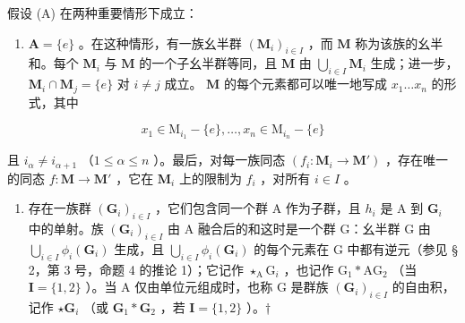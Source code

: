 假设 (A) 在两种重要情形下成立：

\begin{enumerate}
\def\labelenumi{(\alph{enumi})}
\tightlist
\item
  \(\mathbf{A} = \{e\}\) 。在这种情形，有一族幺半群 \((\mathbf{M}_i)_{i\in I}\) ，而 \(\mathbf{M}\) 称为该族的幺半和。每个 \(\mathbf{M}_i\) 与 \(\mathbf{M}\) 的一个子幺半群等同，且 \(\mathbf{M}\) 由 \(\bigcup_{i\in I}\mathbf{M}_i\) 生成；进一步，\(\mathbf{M}_i\cap \mathbf{M}_j = \{e\}\) 对 \(i\neq j\) 成立。 \(\mathbf{M}\) 的每个元素都可以唯一地写成 \(x_{1}\ldots x_{n}\) 的形式，其中
\end{enumerate}

\[
x _ {1} \in \mathrm{M} _ {i _ {1}} - \{e \}, \dots , x _ {n} \in \mathrm{M} _ {i _ {n}} - \{e \}
\]

且 \(i_{\alpha} \neq i_{\alpha + 1}\) （\(1 \leqslant \alpha \leqslant n\) ）。最后，对每一族同态 \((f_i: \mathbf{M}_i \to \mathbf{M}')\) ，存在唯一的同态 \(f: \mathbf{M} \to \mathbf{M}'\) ，它在 \(\mathbf{M}_i\) 上的限制为 \(f_i\) ，对所有 \(i \in I\) 。

\begin{enumerate}
\def\labelenumi{(\alph{enumi})}
\setcounter{enumi}{1}
\tightlist
\item
  存在一族群 \((\mathbf{G}_i)_{i\in I}\) ，它们包含同一个群 A 作为子群，且 \(h_i\) 是 A 到 \(\mathbf{G}_i\) 中的单射。族 \((\mathbf{G}_i)_{i\in I}\) 由 A 融合后的和这时是一个群 G：幺半群 G 由 \(\bigcup_{i\in I}\phi_i(\mathbf{G}_i)\) 生成，且 \(\bigcup_{i\in I}\phi_i(\mathbf{G}_i)\) 的每个元素在 G 中都有逆元（参见 § 2，第 3 号，命题 4 的推论 1）；它记作 \(\star_{\mathrm{A}}\mathrm{G}_{i}\) ，也记作 \(\mathrm{G}_{1}*\mathrm{A}\mathrm{G}_{2}\) （当 \(\mathbf{I} = \{1,2\}\) ）。当 A 仅由单位元组成时，也称 G 是群族 \((\mathbf{G}_i)_{i\in I}\) 的自由积，记作 \(\star \mathbf{G}_i\) （或 \(\mathbf{G}_1*\mathbf{G}_2\) ，若 \(\mathbf{I} = \{1,2\}\) ）。†
\end{enumerate}

